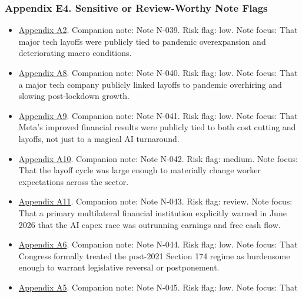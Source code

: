 \documentclass[
  american,
  11pt,
  letterpaper,
]{article}
\providecommand{\tightlist}{%
  \setlength{\itemsep}{0pt}\setlength{\parskip}{0pt}}
\begin{document}
\subsubsection{Appendix E4. Sensitive or Review-Worthy Note
Flags}\label{ch-05-appendix-e4-sensitive-or-review-worthy-note-flags}

\begin{itemize}
\tightlist
\item
  \hyperref[ch-05-appendix-a2-amazon-salesforce-jettison-jobs-in-latest-tech-worker-purge]{Appendix
  A2}. Companion note: Note N-039. Risk flag: low. Note focus: That
  major tech layoffs were publicly tied to pandemic overexpansion and
  deteriorating macro conditions.
\item
  \hyperref[ch-05-appendix-a8-meta-posts-lower-q4-profit-announces-huge-stock-buyback]{Appendix
  A8}. Companion note: Note N-040. Risk flag: low. Note focus: That a
  major tech company publicly linked layoffs to pandemic overhiring and
  slowing post-lockdown growth.
\item
  \hyperref[ch-05-appendix-a9-meta-posts-sharp-profit-revenue-increase-in-q4-thanks-to-cost-cuts-and-advertising-rebound]{Appendix
  A9}. Companion note: Note N-041. Risk flag: low. Note focus: That
  Meta's improved financial results were publicly tied to both cost
  cutting and layoffs, not just to a magical AI turnaround.
\item
  \hyperref[ch-05-appendix-a10-big-tech-layoffs-shattered-industry-worker-confidence]{Appendix
  A10}. Companion note: Note N-042. Risk flag: medium. Note focus: That
  the layoff cycle was large enough to materially change worker
  expectations across the sector.
\item
  \hyperref[ch-05-appendix-a11-annual-economic-report-2026]{Appendix
  A11}. Companion note: Note N-043. Risk flag: review. Note focus: That
  a primary multilateral financial institution explicitly warned in June
  2026 that the AI capex race was outrunning earnings and free cash
  flow.
\item
  \hyperref[ch-05-appendix-a6-h-r-7024-tax-relief-for-american-families-and-workers-act-of-2024-crs-summary]{Appendix
  A6}. Companion note: Note N-044. Risk flag: low. Note focus: That
  Congress formally treated the post-2021 Section 174 regime as
  burdensome enough to warrant legislative reversal or postponement.
\item
  \hyperref[ch-05-appendix-a5-h-r-7024-tax-relief-for-american-families-and-workers-act-of-2024]{Appendix
  A5}. Companion note: Note N-045. Risk flag: low. Note focus: That

\end{itemize}
\end{document}
